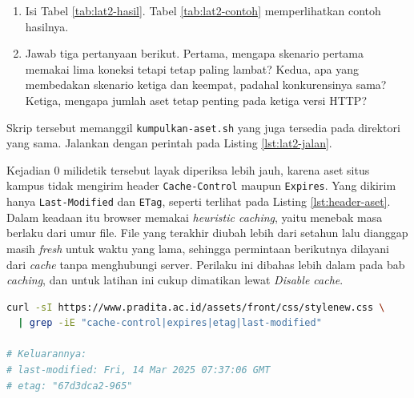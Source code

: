 \begin{enumerate}
        mengumpulkan lima alamat aset halaman yang dituju ke
        \texttt{aset.txt}, memeriksa versi HTTP tiap host, lalu mengambil aset
        tersebut dalam empat skenario, yaitu berurutan tanpa pemakaian ulang
        koneksi, berurutan dengan \textit{keep-alive}, serentak di atas
        HTTP/1.1, dan serentak di atas HTTP/2. Secara bawaan hanya aset milik
        host halaman itu sendiri yang diambil. Jumlah koneksi diambil
        dari \texttt{\%\{num\_connects\}} milik \texttt{curl}, sedangkan pada
        browser angka itu terlihat dari banyaknya nilai berbeda pada kolom
        \emph{Connection ID}.
  \item Isi Tabel \ref{tab:lat2-hasil}. Tabel \ref{tab:lat2-contoh}
        memperlihatkan contoh hasilnya.
  \item Jawab tiga pertanyaan berikut. Pertama, mengapa skenario pertama
        memakai lima koneksi tetapi tetap paling lambat? Kedua, apa yang
        membedakan skenario ketiga dan keempat, padahal konkurensinya sama?
        Ketiga, mengapa jumlah aset tetap penting pada ketiga versi HTTP?
\end{enumerate}

Skrip tersebut memanggil \texttt{kumpulkan-aset.sh} yang juga tersedia pada
direktori yang sama. Jalankan dengan perintah pada Listing
\ref{lst:lat2-jalan}.

Kejadian 0 milidetik tersebut layak diperiksa lebih jauh, karena aset situs
kampus tidak mengirim header \texttt{Cache-Control} maupun \texttt{Expires}.
Yang dikirim hanya \texttt{Last-Modified} dan \texttt{ETag}, seperti terlihat
pada Listing \ref{lst:header-aset}. Dalam keadaan itu browser memakai
\textit{heuristic caching}, yaitu menebak masa berlaku dari umur file. File
yang terakhir diubah lebih dari setahun lalu dianggap masih \textit{fresh} untuk waktu
yang lama, sehingga permintaan berikutnya dilayani dari \textit{cache} tanpa
menghubungi server. Perilaku ini dibahas lebih dalam pada bab \textit{caching},
dan untuk latihan ini cukup dimatikan lewat \emph{Disable cache}.

\begin{lstlisting}[language=bash, caption={Header aset situs kampus, tanpa \texttt{Cache-Control}}, label={lst:header-aset}]
curl -sI https://www.pradita.ac.id/assets/front/css/stylenew.css \
  | grep -iE "cache-control|expires|etag|last-modified"

# Keluarannya:
# last-modified: Fri, 14 Mar 2025 07:37:06 GMT
# etag: "67d3dca2-965"
\end{lstlisting}

